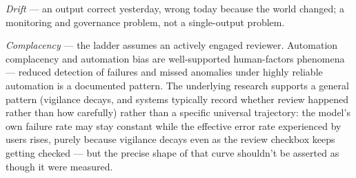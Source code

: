 \emph{Drift} --- an output correct yesterday, wrong today because the world changed; a monitoring and governance problem, not a single-output problem.

\emph{Complacency} --- the ladder assumes an actively engaged reviewer. Automation complacency and automation bias are well-supported human-factors phenomena --- reduced detection of failures and missed anomalies under highly reliable automation is a documented pattern. The underlying research supports a general pattern (vigilance decays, and systems typically record whether review happened rather than how carefully) rather than a specific universal trajectory: the model's own failure rate may stay constant while the effective error rate experienced by users rises, purely because vigilance decays even as the review checkbox keeps getting checked --- but the precise shape of that curve shouldn't be asserted as though it were measured.

